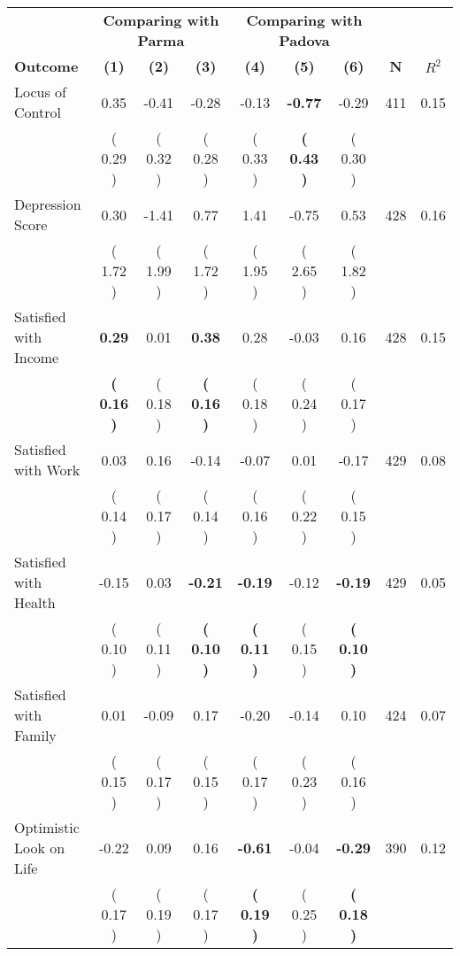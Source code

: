 \begin{tabular}{lcccccccc}
\toprule
 & \multicolumn{3}{c}{\textbf{Comparing with Parma}} & \multicolumn{3}{c}{\textbf{Comparing with Padova}} & \\
\cmidrule(lr){2-4} \cmidrule(lr){5-7} 
 \textbf{Outcome} & \textbf{(1)} & \textbf{(2)} & \textbf{(3)} & \textbf{(4)} & \textbf{(5)} & \textbf{(6)} & \textbf{N} & \textbf{$ R^2$} \\
\midrule
Locus of Control &      0.35 &     -0.41 &     -0.28 &     -0.13 & \textbf{    -0.77} &     -0.29 & 411 &       0.15 \\ 
 & (     0.29 ) & (     0.32 ) & (     0.28 ) & (     0.33 ) & \textbf{(     0.43 )} & (     0.30 ) & \\
Depression Score &      0.30 &     -1.41 &      0.77 &      1.41 &     -0.75 &      0.53 & 428 &       0.16 \\ 
 & (     1.72 ) & (     1.99 ) & (     1.72 ) & (     1.95 ) & (     2.65 ) & (     1.82 ) & \\
Satisfied with Income & \textbf{     0.29} &      0.01 & \textbf{     0.38} &      0.28 &     -0.03 &      0.16 & 428 &       0.15 \\ 
 & \textbf{(     0.16 )} & (     0.18 ) & \textbf{(     0.16 )} & (     0.18 ) & (     0.24 ) & (     0.17 ) & \\
Satisfied with Work &      0.03 &      0.16 &     -0.14 &     -0.07 &      0.01 &     -0.17 & 429 &       0.08 \\ 
 & (     0.14 ) & (     0.17 ) & (     0.14 ) & (     0.16 ) & (     0.22 ) & (     0.15 ) & \\
Satisfied with Health &     -0.15 &      0.03 & \textbf{    -0.21} & \textbf{    -0.19} &     -0.12 & \textbf{    -0.19} & 429 &       0.05 \\ 
 & (     0.10 ) & (     0.11 ) & \textbf{(     0.10 )} & \textbf{(     0.11 )} & (     0.15 ) & \textbf{(     0.10 )} & \\
Satisfied with Family &      0.01 &     -0.09 &      0.17 &     -0.20 &     -0.14 &      0.10 & 424 &       0.07 \\ 
 & (     0.15 ) & (     0.17 ) & (     0.15 ) & (     0.17 ) & (     0.23 ) & (     0.16 ) & \\
Optimistic Look on Life &     -0.22 &      0.09 &      0.16 & \textbf{    -0.61} &     -0.04 & \textbf{    -0.29} & 390 &       0.12 \\ 
 & (     0.17 ) & (     0.19 ) & (     0.17 ) & \textbf{(     0.19 )} & (     0.25 ) & \textbf{(     0.18 )} & \\

\end{tabular}
